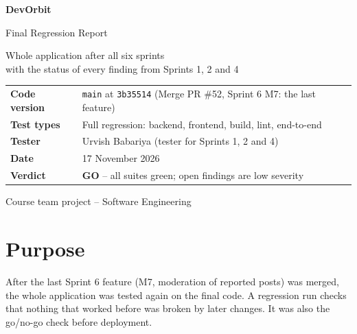 \documentclass[11pt,a4paper]{article}
\begin{document}
\begin{titlepage}\centering\vspace*{2.5cm}
{\Huge\bfseries\color{accent} DevOrbit\par}\vspace{0.6cm}
{\LARGE Final Regression Report\par}\vspace{0.3cm}
{\Large Whole application after all six sprints\\ with the status of every finding from Sprints 1, 2 and 4\par}\vspace{1.5cm}
\begin{tabular}{>{\bfseries}l l}
Code version & \texttt{main} at \texttt{3b35514} (Merge PR \#52, Sprint 6 M7: the last feature) \\
Test types   & Full regression: backend, frontend, build, lint, end-to-end \\
Tester       & Urvish Babariya (tester for Sprints 1, 2 and 4) \\
Date         & 17 November 2026 \\
Verdict      & \textbf{\textcolor{passgreen}{GO}} -- all suites green; open findings are low severity \\
\end{tabular}\vfill{\small Course team project -- Software Engineering\par}
\end{titlepage}
\tableofcontents\newpage

\section{Purpose}
After the last Sprint 6 feature (M7, moderation of reported posts) was merged, the whole application was tested again on the final code.
A regression run checks that nothing that worked before was broken by later changes. It was also the go/no-go check before deployment.
\end{document}

